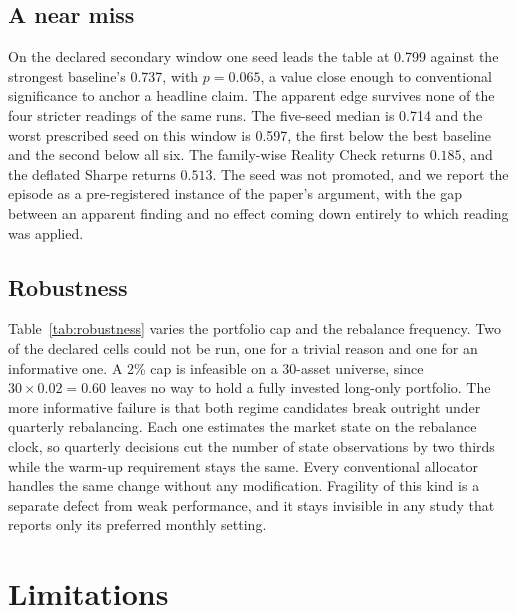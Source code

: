\documentclass[sigconf,nonacm]{acmart}
\begin{document}
\subsection{A near miss}
On the declared secondary window
one seed leads the table at 0.799 against the strongest baseline's 0.737, with
$p{=}0.065$, a value close enough to conventional significance to anchor a
headline claim. The apparent edge survives none of the four stricter readings of the same
runs. The five-seed median is
0.714 and the worst prescribed seed on this window is 0.597, the first below the
best baseline and the second below all six. The family-wise Reality Check
returns $0.185$, and the deflated Sharpe returns $0.513$. The seed was not promoted, and we report the episode as a pre-registered
instance of the paper's argument, with the gap between an apparent finding and
no effect coming down entirely to which reading was applied.



\subsection{Robustness}
Table~\ref{tab:robustness} varies the portfolio cap and
the rebalance frequency. Two of the declared cells could not be run, one for a trivial reason and one
for an informative one. A 2\% cap is infeasible on a 30-asset universe, since
$30\times0.02=0.60$ leaves no way to hold a fully invested long-only
portfolio. The more informative failure is that both regime candidates break
outright under quarterly rebalancing. Each one estimates the market state
on the rebalance clock, so quarterly decisions cut the number of state
observations by two thirds while the warm-up requirement stays the same. Every
conventional allocator handles the same change without any modification.
Fragility of this kind is a separate defect from weak performance, and it stays
invisible in any study that reports only its preferred monthly setting.

\section{Limitations}
\end{document}
